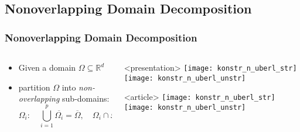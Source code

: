 \subsection{Nonoverlapping Domain Decomposition}
\begin{frame}
  \frametitle<presentation>{Nonoverlapping Domain Decomposition}

  \begin{columns}
    \begin{column}{0.6\linewidth}

      \begin{itemize}
      \item Given a domain $\Omega\subseteq\mathbb{R}^d$
      \item partition $\Omega$ into \emph{non-overlapping}
        sub-domains:
        \[
        \Omega_i\colon\quad \bigcup_{i=1}^p \overline{\Omega_i} = \overline{\Omega}, \quad
        \Omega_i\cap\Omega_j=\emptyset \;\forall i\ne j.
        \]
      \end{itemize}
    \end{column}
    \begin{column}{0.4\linewidth}
      \begin{onlyenv}<presentation>
        \texttt{[image: konstr\_n\_uberl\_str]}
        \vskip5mm
        \texttt{[image: konstr\_n\_uberl\_unstr]}
      \end{onlyenv}
      \begin{onlyenv}<article>
        \texttt{[image: konstr\_n\_uberl\_str]}
        \vskip5mm
        \texttt{[image: konstr\_n\_uberl\_unstr]}
      \end{onlyenv}
    \end{column}
  \end{columns}
\end{frame}

